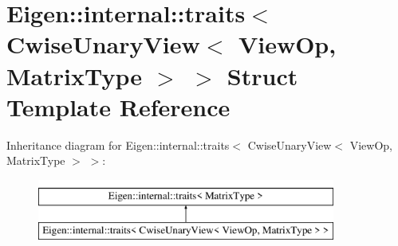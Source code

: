 \hypertarget{struct_eigen_1_1internal_1_1traits_3_01_cwise_unary_view_3_01_view_op_00_01_matrix_type_01_4_01_4}{}\section{Eigen\+::internal\+::traits$<$ Cwise\+Unary\+View$<$ View\+Op, Matrix\+Type $>$ $>$ Struct Template Reference}
\label{struct_eigen_1_1internal_1_1traits_3_01_cwise_unary_view_3_01_view_op_00_01_matrix_type_01_4_01_4}
Inheritance diagram for Eigen\+::internal\+::traits$<$ Cwise\+Unary\+View$<$ View\+Op, Matrix\+Type $>$ $>$\+:\begin{figure}[H]
\begin{center}
\leavevmode
\includegraphics[height=2.000000cm]{struct_eigen_1_1internal_1_1traits_3_01_cwise_unary_view_3_01_view_op_00_01_matrix_type_01_4_01_4}
\end{center}
\end{figure}
